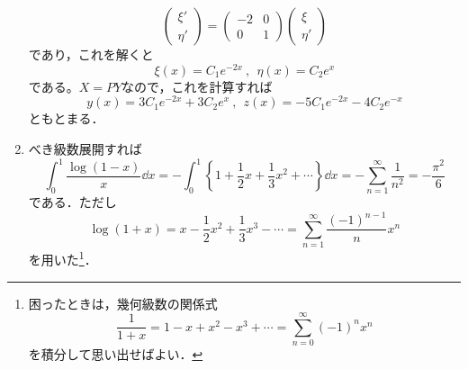\documentclass[a4paper,pdflatex,ja=standard]{bxjsarticle}
\begin{document}
\begin{enumerate}
  \begin{equation}
    \begin{pmatrix}
      \xi' \\
      \eta'
    \end{pmatrix}
    =
    \begin{pmatrix}
      -2 & 0 \\
      0 & 1
    \end{pmatrix}
    \begin{pmatrix}
      \xi \\
      \eta'
    \end{pmatrix}
  \end{equation}
  であり，これを解くと
  \begin{equation}
    \xi(x)
    =
    C_{1}e^{-2x}
    \ ,\ \ 
    \eta(x)
    =
    C_{2}e^{x}
  \end{equation}
  である。$X=PY$なので，これを計算すれば
  \begin{equation}
    y(x)
    =
    3C_{1}e^{-2x}+3C_{2}e^{x}
    \ ,\ \ 
    z(x)
    =
    -5C_{1}e^{-2x}-4C_{2}e^{-x}
  \end{equation}
  ともとまる．

  \item 
  べき級数展開すれば
  \begin{equation}
    \int_{0}^{1}\frac{\log(1-x)}{x}\dd x
    =
    -\int_{0}^{1}\left\{ 1+\frac{1}{2}x+\frac{1}{3}x^2+\cdots \right\}\dd x
    =
    -\sum_{n=1}^{\infty}\frac{1}{n^2}
    =
    -\frac{\pi^2}{6}
  \end{equation}
  である．ただし
  \begin{equation}
    \log(1+x)
    =
    x-\frac{1}{2}x^2+\frac{1}{3}x^3-\cdots
    =
    \sum_{n=1}^{\infty}\frac{(-1)^{n-1}}{n}x^{n}
  \end{equation}
  を用いた\footnote{困ったときは，幾何級数の関係式$$\frac{1}{1+x}=1-x+x^2-x^{3}+\cdots=\sum_{n=0}^{\infty}(-1)^{n}x^{n}$$を積分して思い出せばよい．}．
\end{enumerate}
\end{document}
